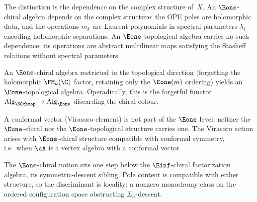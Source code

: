 \begin{remark}
\label{rem:e1-chiral-vs-topological}
The distinction is the dependence on the complex structure of~$X$.
An $\Eone$-chiral algebra depends on the complex structure: the OPE
poles are holomorphic data, and the operations $m_k$ are Laurent
polynomials in spectral parameters $\lambda_i$ encoding holomorphic
separations. An $\Eone$-topological algebra carries no such
dependence: its operations are abstract multilinear maps satisfying
the Stasheff relations without spectral parameters.

An $\Eone$-chiral algebra restricted to the topological direction
(forgetting the holomorphic $\FM_k(\C)$ factor, retaining only the
$\Eone(m)$ ordering) yields an $\Eone$-topological algebra. Operadically,
this is the forgetful functor
$\mathrm{Alg}_{\SCchtop} \to \mathrm{Alg}_{\Eone}$ discarding the
chiral colour.

A conformal vector (Virasoro element) is not part of the $\Eone$
level: neither the $\Eone$-chiral nor the $\Eone$-topological
structure carries one. The Virasoro action arises with
$\Eone$-chiral structure compatible with conformal symmetry, i.e.\
when $\cA$ is a vertex algebra with a conformal vector.
\end{remark}

The $\Eone$-chiral notion sits one step below the
$\Einf$-chiral factorization algebra, its symmetric-descent sibling.
Pole content is compatible with either structure, so the
discriminant is locality: a nonzero monodromy class on the ordered
configuration space obstructing $\Sigma_n$-descent.

